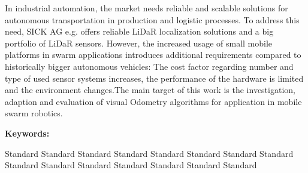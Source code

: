 \noindent
\normalsize
In industrial automation, the market needs reliable and scalable solutions for autonomous transportation in production and logistic processes. To address this need, SICK AG e.g. offers reliable LiDaR localization solutions and a big portfolio of LiDaR sensors. However, the
increased usage of small mobile platforms in swarm applications introduces additional requirements compared to historically bigger autonomous vehicles: The cost factor regarding number and type of used sensor systems increases, the performance of the hardware is limited
and the environment changes.The main target of this work is the investigation, adaption and evaluation of visual Odometry
algorithms for application in mobile swarm robotics.
 
\vspace{16pt}
\noindent\huge\textbf{Keywords:}
 
\vspace{16pt}
\normalsize
\noindent
    Standard Standard Standard Standard Standard Standard Standard Standard Standard Standard Standard Standard Standard Standard Standard